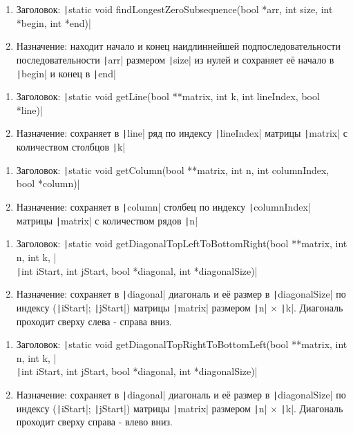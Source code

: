 \documentclass[a4paper, 12pt, oneside]{article}
\begin{document}
    \begin{enumerate}
        \item Заголовок:  \texttt|static void findLongestZeroSubsequence(bool *arr, int size, int *begin, int *end)|
        \item Назначение: находит начало и конец наидлиннейшей подпоследовательности последовательности \texttt|arr|
        размером \texttt|size| из нулей и сохраняет её начало в \texttt|begin| и конец в \texttt|end|
    \end{enumerate}
    \hline
    \begin{enumerate}
        \item Заголовок:  \texttt|static void getLine(bool **matrix, int k, int lineIndex, bool *line)|
        \item Назначение: сохраняет в \texttt|line| ряд по индексу \texttt|lineIndex| матрицы \texttt|matrix|
        с количеством столбцов \texttt|k|
    \end{enumerate}
    \hline
    \begin{enumerate}
        \item Заголовок:  \texttt|static void getColumn(bool **matrix, int n, int columnIndex, bool *column)|
        \item Назначение: сохраняет в \texttt|column| столбец по индексу \texttt|columnIndex| матрицы \texttt|matrix|
        с количеством рядов \texttt|n|
    \end{enumerate}
    \hline
    \begin{enumerate}
        \item Заголовок:  \texttt|static void getDiagonalTopLeftToBottomRight(bool **matrix, int n, int k, |\\
        \texttt|int iStart, int jStart, bool *diagonal, int *diagonalSize)|
        \item Назначение: сохраняет в \texttt|diagonal| диагональ и её размер в \texttt|diagonalSize| по индексу (\texttt|iStart|; \texttt|jStart|) матрицы \texttt|matrix|
        размером \texttt|n| $\times$ \texttt|k|.
        Диагональ проходит сверху слева - справа вниз.
    \end{enumerate}
    \hline
    \begin{enumerate}
        \item Заголовок:  \texttt|static void getDiagonalTopRightToBottomLeft(bool **matrix, int n, int k, |\\
        \texttt|int iStart, int jStart, bool *diagonal, int *diagonalSize)|
        \item Назначение: сохраняет в \texttt|diagonal| диагональ и её размер в \texttt|diagonalSize| по индексу (\texttt|iStart|; \texttt|jStart|) матрицы \texttt|matrix|
        размером \texttt|n| $\times$ \texttt|k|.
        Диагональ проходит сверху справа - влево вниз.
    \end{enumerate}
\end{document}
